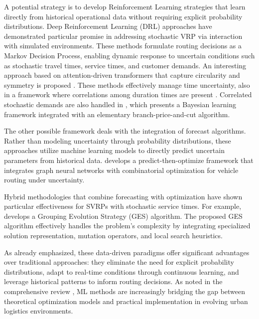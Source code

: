 \documentclass[preprint,12pt]{elsarticle}
\begin{document}
A potential strategy is to develop Reinforcement Learning strategies that learn directly from historical operational data without requiring explicit probability distributions. Deep Reinforcement Learning (DRL) approaches \cite{Nazari2018, Raza2022, Pan2023} have demonstrated particular promise in addressing stochastic VRP via interaction with simulated environments. These methods formulate routing decisions as a Markov Decision Process, enabling dynamic response to uncertain conditions such as stochastic travel times, service times, and customer demands. An interesting approach based on attention-driven transformers that capture circularity and symmetry is proposed \cite{Guan2025}. These methods effectively manage time uncertainty, also in a framework where correlations among duration times are present \cite{Iklassov2023}. Correlated stochastic demands are also handled in \cite{Florio2023}, which presents a Bayesian learning framework integrated with an elementary branch-price-and-cut algorithm. 

The other possible framework deals with the integration of forecast algorithms. Rather than modeling uncertainty through probability distributions, these approaches utilize machine learning models to directly predict uncertain parameters from historical data. \cite{Chang2024} develops a predict-then-optimize framework that integrates graph neural networks with combinatorial optimization for vehicle routing under uncertainty.

Hybrid methodologies that combine forecasting with optimization have shown particular effectiveness for SVRPs with stochastic service times. For example, \cite{Rezvanian2025} develops a Grouping Evolution Strategy (GES) algorithm. The proposed GES algorithm effectively handles the problem's complexity by integrating specialized solution representation, mutation operators, and local search heuristics.




As already emphasized, these data-driven paradigms offer significant advantages over traditional approaches: they eliminate the need for explicit probability distributions, adapt to real-time conditions through continuous learning, and leverage historical patterns to inform routing decisions. As noted in the comprehensive review \cite{Soeffker2022}, ML methods are increasingly bridging the gap between theoretical optimization models and practical implementation in evolving urban logistics environments.


\medskip
\end{document}
